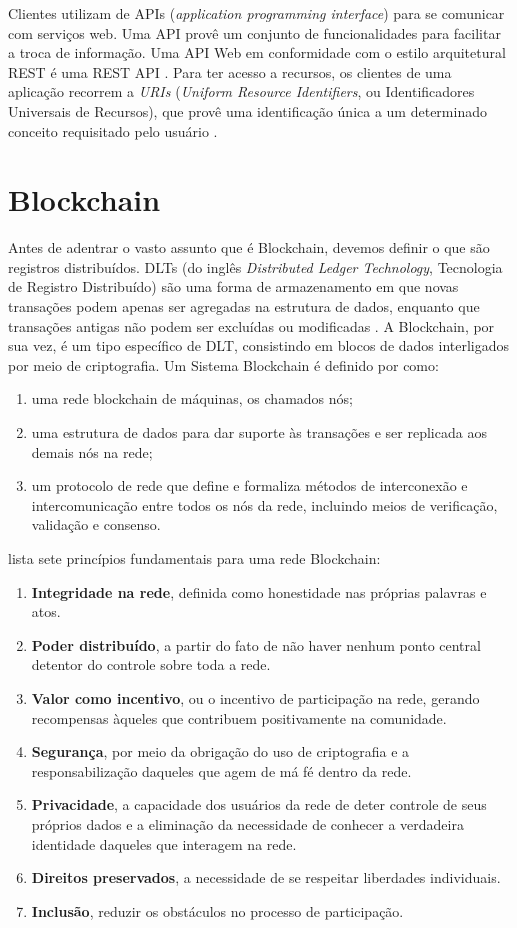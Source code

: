 Clientes utilizam de APIs (\emph{application programming interface}) para se comunicar com serviços web. Uma API provê um conjunto de funcionalidades para facilitar a troca de informação. Uma API Web em conformidade com o estilo arquitetural REST é uma REST API \cite{Masse2011-cf}. Para ter acesso a recursos, os clientes de uma aplicação recorrem a \emph{URIs} (\emph{Uniform Resource Identifiers}, ou Identificadores Universais de Recursos), que provê uma identificação única a um determinado conceito requisitado pelo usuário \cite{Masse2011-cf}.

\section{Blockchain}

Antes de adentrar o vasto assunto que é Blockchain, devemos definir o que são registros distribuídos. DLTs (do inglês \emph{Distributed Ledger Technology}, Tecnologia de Registro Distribuído) são uma forma de armazenamento em que novas transações podem apenas ser agregadas na estrutura de dados, enquanto que transações antigas não podem ser excluídas ou modificadas \cite{Xu2019-qi}. A Blockchain, por sua vez, é um tipo específico de DLT, consistindo em blocos de dados interligados por meio de criptografia. Um Sistema  Blockchain é definido por \cite{Xu2019-qi} como:
\begin{enumerate}
    \item uma rede blockchain de máquinas, os chamados nós;
    \item uma estrutura de dados para dar suporte às transações e ser replicada aos demais nós na rede;
    \item um protocolo de rede que define e formaliza métodos de interconexão e intercomunicação entre todos os nós da rede, incluindo meios de verificação, validação e consenso.
\end{enumerate}
\cite{Tapscott2016} lista sete princípios fundamentais para uma rede Blockchain:
\begin{enumerate}
    \item \textbf{Integridade na rede}, definida como honestidade nas próprias palavras e atos.
    \item \textbf{Poder distribuído}, a partir do fato de não haver nenhum ponto central detentor do controle sobre toda a rede.
    \item \textbf{Valor como incentivo}, ou o incentivo de participação na rede, gerando recompensas àqueles que contribuem positivamente na comunidade.
    \item \textbf{Segurança}, por meio da obrigação do uso de criptografia e a responsabilização daqueles que agem de má fé dentro da rede.
    \item \textbf{Privacidade}, a capacidade dos usuários da rede de deter controle de seus próprios dados e a eliminação da necessidade de conhecer a verdadeira identidade daqueles que interagem na rede.
    \item \textbf{Direitos preservados}, a necessidade de se respeitar liberdades individuais.
    \item \textbf{Inclusão}, reduzir os obstáculos no processo de participação.
\end{enumerate}

